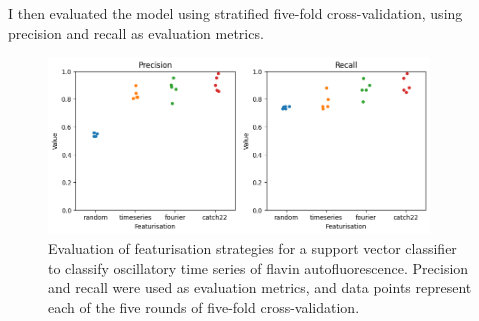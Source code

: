 I then evaluated the model using stratified five-fold cross-validation, using precision and recall as evaluation metrics.

\begin{figure}
  \centering
  \includegraphics[width=0.9\textwidth]{precision_recall}
  \caption{
    Evaluation of featurisation strategies for a support vector classifier to classify oscillatory time series of flavin autofluorescence.
    Precision and recall were used as evaluation metrics, and data points represent each of the five rounds of five-fold cross-validation.
  }
  \label{fig:analysis-precision-recall}
\end{figure}

